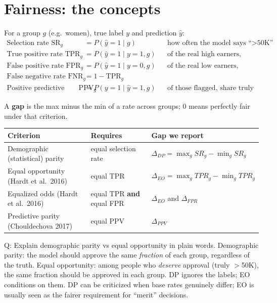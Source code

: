 \documentclass[11pt,a4paper]{article}
\newcommand{\yhat}{\hat{y}}
\begin{document}
\section{Fairness: the concepts}\label{sec:fairness}

For a group $g$ (e.g.\ women), true label $y$ and prediction $\yhat$:
{\small\begin{align*}
\text{Selection rate } \mathrm{SR}_g &= P(\yhat=1\mid g) && \text{how often the model says ``$>$50K''}\\
\text{True positive rate } \mathrm{TPR}_g &= P(\yhat=1\mid y=1,g) && \text{of the real high earners, share found (= recall)}\\
\text{False positive rate } \mathrm{FPR}_g &= P(\yhat=1\mid y=0,g) && \text{of the real low earners, share wrongly flagged}\\
\text{False negative rate } \mathrm{FNR}_g &= 1-\mathrm{TPR}_g\\
\text{Positive predictive value } \mathrm{PPV}_g &= P(y=1\mid \yhat=1,g) && \text{of those flagged, share truly high (= precision)}
\end{align*}}

A \textbf{gap} is the max minus the min of a rate across groups; 0 means perfectly fair under that criterion.

\begin{center}\small
\begin{tabular}{lll}
\toprule
Criterion & Requires & Gap we report \\
\midrule
Demographic (statistical) parity & equal selection rate & $\Delta_{DP}=\max_g SR_g-\min_g SR_g$ \\
Equal opportunity (Hardt et al.\ 2016) & equal TPR & $\Delta_{EO}=\max_g TPR_g-\min_g TPR_g$ \\
Equalized odds (Hardt et al.\ 2016) & equal TPR \textbf{and} equal FPR & $\Delta_{EO}$ and $\Delta_{FPR}$ \\
Predictive parity (Chouldechova 2017) & equal PPV & $\Delta_{PPV}$ \\
\bottomrule
\end{tabular}
\end{center}

\begin{qa}{Q: Explain demographic parity vs equal opportunity in plain words.}
Demographic parity: the model should approve the same \emph{fraction} of each group, regardless of the truth. Equal opportunity: among people who \emph{deserve} approval (truly $>$50K), the same fraction should be approved in each group. DP ignores the labels; EO conditions on them. DP can be criticized when base rates genuinely differ; EO is usually seen as the fairer requirement for ``merit'' decisions.
\end{qa}
\end{document}
